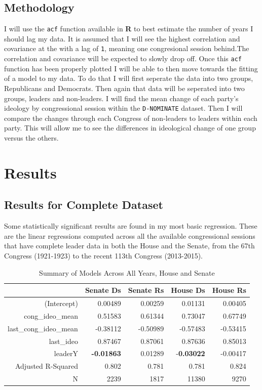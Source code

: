 \documentclass[12pt,twoside]{reedthesis}
\begin{document}
  \section{Methodology}\label{methodology}
  
  I will use the \texttt{acf} function available in \textbf{R} to best
  estimate the number of years I should lag my data. It is assumed that I
  will see the highest correlation and covariance at the with a lag of
  \texttt{1}, meaning one congresional session behind.The correlation and
  covariance will be expected to slowly drop off. Once this \texttt{acf}
  function has been properly plotted I will be able to then move towards
  the fitting of a model to my data. To do that I will first seperate the
  data into two groups, Republicans and Democrats. Then again that data
  will be seperated into two groups, leaders and non-leaders. I will find
  the mean change of each party's ideology by congressional session within
  the \texttt{D-NOMINATE} dataset. Then I will compare the changes through
  each Congress of non-leaders to leaders within each party. This will
  allow me to see the differences in ideological change of one group
  versus the others.
  
  \chapter{Results}\label{results}
  
  \section{Results for Complete
  Dataset}\label{results-for-complete-dataset}
  
  Some statistically significant results are found in my most basic
  regression. These are the linear regressions computed across all the
  available congressional sessions that have complete leader data in both
  the House and the Senate, from the 67th Congress (1921-1923) to the
  recent 113th Congress (2013-2015).
  
  \begin{table}[h]
  \centering
  \caption{Summary of Models Across All Years, House and Senate}
  \begin{tabular}{r|rrrr}
                         & Senate Ds & Senate Rs & House Ds & House Rs \\ \hline
  (Intercept)            & 0.00489   & 0.00259   & 0.01131  & 0.00405  \\
  cong\_ideo\_mean       & 0.51583   & 0.61344   & 0.73047  & 0.67749  \\
  last\_cong\_ideo\_mean & -0.38112  & -0.50989  & -0.57483 & -0.53415 \\
  last\_ideo             & 0.87467   & 0.87061   & 0.87636  & 0.85013  \\
  leaderY                & \textbf{-0.01863}  & 0.01289   & -\textbf{0.03022} & -0.00417 \\
  Adjusted R-Squared     & 0.802     & 0.781     & 0.781    & 0.824    \\
  N                      & 2239      & 1817      & 11380    & 9270    
  \end{tabular}
  \end{table}
  
\end{document}
